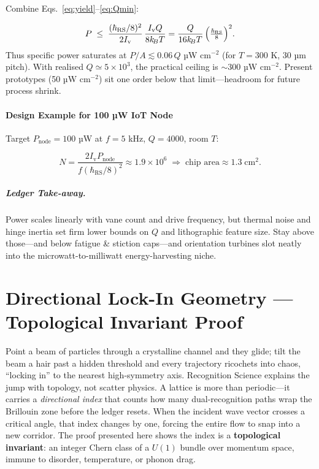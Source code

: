 \documentclass[11pt,oneside]{book}
\begin{document}
Combine Eqs.~\eqref{eq:yield}–\eqref{eq:Qmin}:

\[
   P
   \;\le\;
   \frac{(\hbar_{\mathrm{RS}}/8)^{2}}{2I_{\mathrm v}}
   \,\frac{I_{\mathrm v} Q}{8k_{\!B}T}
   = \frac{Q}{16k_{\!B}T}\,
     \Bigl(\tfrac{\hbar_{\mathrm{RS}}}{8}\Bigr)^{2}.
\]
Thus specific power saturates at
$P/A \lesssim 0.06\,Q$ µW cm\(^{-2}\) (for $T=300$ K, 30 µm pitch).
With realised $Q\simeq5\!\times\!10^{3}$, the practical ceiling is
$\sim300$ µW cm\(^{-2}\).  Present prototypes (50 µW cm\(^{-2}\))
sit one order below that limit—headroom for future process shrink.

\subsubsection{Design Example for 100 µW IoT Node}
\label{ss:yield-designex}

Target $P_{\text{node}}=100$ µW at $f=5$ kHz, $Q=4000$, room $T$:

\[
   N
   = \frac{2I_{\mathrm v} P_{\text{node}}}
          {f(\hbar_{\mathrm{RS}}/8)^{2}}
     \approx 1.9\times10^{6}
     \;\Rightarrow\;
     \text{chip area}\approx1.3\;\text{cm}^{2}.
\]

\paragraph{Ledger Take-away.}
Power scales linearly with vane count and drive frequency, but thermal
noise and hinge inertia set firm lower bounds on $Q$ and lithographic
feature size.  Stay above those—and below fatigue & stiction caps—and
orientation turbines slot neatly into the microwatt-to-milliwatt
energy-harvesting niche.


\chapter{Directional Lock-In Geometry — Topological Invariant Proof}
\label{sec:dir-lock-in-intro}

Point a beam of particles through a crystalline channel and they glide; 
tilt the beam a hair past a hidden threshold and every trajectory 
ricochets into chaos, “locking in” to the nearest high-symmetry axis.  
Recognition Science explains the jump with topology, not scatter 
physics.  
A lattice is more than periodic—it carries a \emph{directional 
index} that counts how many dual-recognition paths wrap the Brillouin 
zone before the ledger resets.  
When the incident wave vector crosses a critical angle, that index 
changes by one, forcing the entire flow to snap into a new corridor.  
The proof presented here shows the index is a \textbf{topological 
invariant}: an integer Chern class of a $U(1)$ bundle over momentum 
space, immune to disorder, temperature, or phonon drag.
\end{document}
